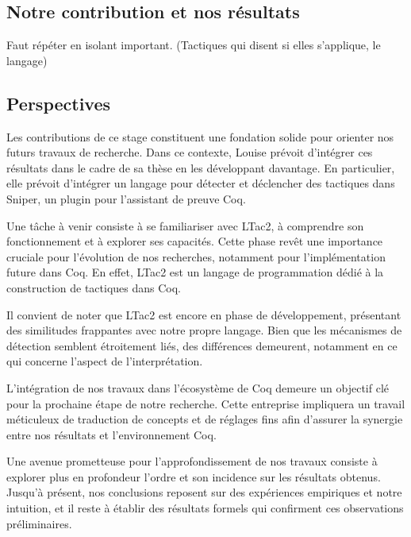 \documentclass[titlepage]{article}
\begin{document}
\subsection{Notre contribution et nos résultats}
Faut répéter en isolant important. (Tactiques qui disent si elles s'applique, le langage)
\subsection{Perspectives}

Les contributions de ce stage constituent une fondation solide pour orienter nos futurs travaux de recherche. Dans ce contexte, Louise prévoit d'intégrer ces résultats dans le cadre de sa thèse en les développant davantage. En particulier, elle prévoit d'intégrer un langage pour détecter et déclencher des tactiques dans Sniper, un plugin pour l'assistant de preuve Coq.

Une tâche à venir consiste à se familiariser avec LTac2, à comprendre son fonctionnement et à explorer ses capacités. Cette phase revêt une importance cruciale pour l'évolution de nos recherches, notamment pour l'implémentation future dans Coq. En effet, LTac2 est un langage de programmation dédié à la construction de tactiques dans Coq.

Il convient de noter que LTac2 est encore en phase de développement, présentant des similitudes frappantes avec notre propre langage. Bien que les mécanismes de détection semblent étroitement liés, des différences demeurent, notamment en ce qui concerne l'aspect de l'interprétation.

L'intégration de nos travaux dans l'écosystème de Coq demeure un objectif clé pour la prochaine étape de notre recherche. Cette entreprise impliquera un travail méticuleux de traduction de concepts et de réglages fins afin d'assurer la synergie entre nos résultats et l'environnement Coq.

Une avenue prometteuse pour l'approfondissement de nos travaux consiste à explorer plus en profondeur l'ordre et son incidence sur les résultats obtenus. Jusqu'à présent, nos conclusions reposent sur des expériences empiriques et notre intuition, et il reste à établir des résultats formels qui confirment ces observations préliminaires.



\newpage
\appendix
\end{document}
